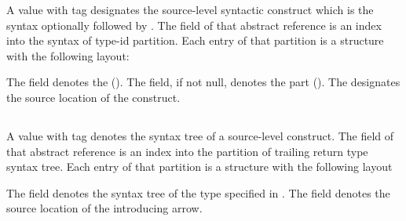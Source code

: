 A  value with tag  designates the source-level
syntactic construct  which is the syntax
 optionally followed by . 
The  field of that abstract reference is an index into the syntax of type-id partition.
Each entry of that partition is a structure with the following layout:
%
\begin{figure}[H]
	\centering
	\label{fig:ifc:SyntaxSort:TypeId}
\end{figure}
%
The  field denotes the  ().
The  field, if not null, denotes the  part ().
The  designates the source location of the  construct.



\subsection{}
\label{sec:ifc:SyntaxSort:TrailingReturnType}

A  value with tag  denotes the syntax tree of a source-level  construct.
The  field of that abstract reference is an index into the partition of trailing return type syntax tree.
Each entry of that partition is a structure with the following layout
%
\begin{figure}[H]
	\centering
	\label{fig:ifc:SyntaxSort:TrailingReturnType}
\end{figure}
%
The  field denotes the syntax tree of the type specified in .
The  field denotes the source location of the introducing arrow.




